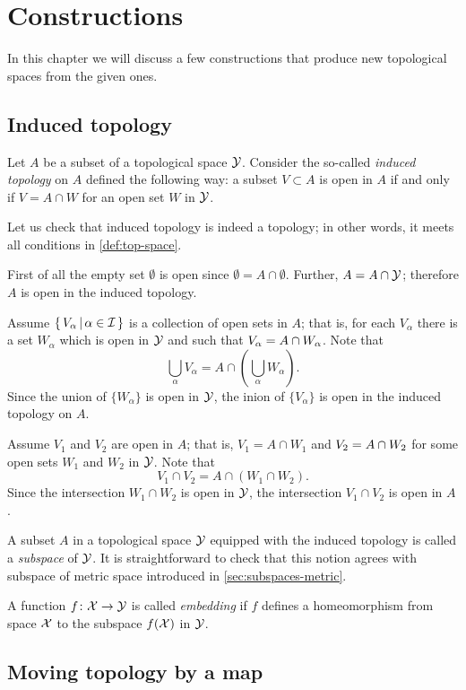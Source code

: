 \chapter{Constructions}

In this chapter we will discuss a few constructions that produce new topological spaces from the given ones.

\section{Induced topology}\label{sec:induced-topology}

Let $A$ be a subset of a topological space $\mathcal{Y}$.
Consider the so-called \emph{induced topology} on $A$ defined the following way:
a subset $V\subset A$ is open in $A$ if and only if $V=A\cap W$ for an open set $W$ in $\mathcal{Y}$.

Let us check that induced topology is indeed a topology;
in other words, it meets all conditions in \ref{def:top-space}.

First of all the empty set
$\emptyset$ is open since $\emptyset=A\cap \emptyset$.
Further, $A=A\cap \mathcal{Y}$;
therefore $A$ is open in the induced topology.

Assume $\left\{\,{V_\alpha}\,\middle|\,{\alpha\in\mathcal{I}}\,\right\}$ is a collection of open sets in $A$;
that is, for each $V_\alpha$ there is a set $W_\alpha$ which is open in $\mathcal{Y}$ and such that $V_\alpha\z=A\cap W_\alpha$.
Note that
\[\bigcup_\alpha V_\alpha=A\cap\left(\bigcup_\alpha W_\alpha\right).\]
Since the union of $\{W_\alpha\}$ is open in $\mathcal{Y}$, the inion of $\{V_\alpha\}$ is open in the induced topology on $A$.

Assume $V_1$ and $V_2$ are open in $A$; 
that is, $V_1=A\cap W_1$ and  $V_2\z=A\cap W_2$ for some open sets $W_1$ and $W_2$ in $\mathcal{Y}$.
Note that
\[V_1\cap V_2=A\cap(W_1\cap W_2).\]
Since the intersection $W_1\cap W_2$ is open in $\mathcal{Y}$,
the intersection $V_1\cap V_2$ is open in $A$.


A subset $A$ in a topological space $\mathcal{Y}$ equipped with the induced topology is called a \emph{subspace} of $\mathcal{Y}$.
It is straightforward to check that this notion agrees with subspace of metric space introduced in \ref{sec:subspaces-metric}.

A function $f\colon\mathcal{X}\to \mathcal{Y}$ is called \emph{embedding} if $f$ defines a homeomorphism from space $\mathcal{X}$ to the subspace $f(\mathcal{X})$ in $\mathcal{Y}$.

\section{Moving topology by a map}

